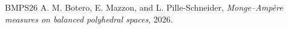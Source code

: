 \documentclass{article}
\begin{document}


\begin{thebibliography}{BMPS26}
A. M. Botero, E. Mazzon, and L. Pille-Schneider,
\emph{Monge--Amp\`ere measures on balanced polyhedral spaces}, 2026.
\end{thebibliography}
\end{document}

